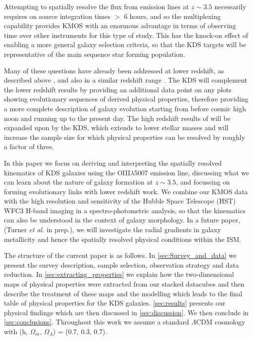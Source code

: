 \documentclass[a4paper,fleqn,usenatbib]{mn2e}
\begin{document}
Attempting to spatially resolve the flux from emission lines at $z \sim 3.5$ necessarily requires on source integration times $>$ 6 hours, and so the multiplexing capability provides KMOS with an enormous advantage in terms of observing time over other instruments for this type of study.
This has the knock-on effect of enabling a more general galaxy selection criteria, so that the KDS targets will be representative of the main sequence star forming population. 

Many of these questions have already been addressed at lower redshift, as described above \citep{ForsterSchreiber2009,Wisnioski2015,Stott2016}, and also in a similar redshift range \cite{Gnerucci2011}.
The KDS will complement the lower redshift results by providing an additional data point on any plots showing evolutionary sequences of derived physical properties, therefore providing a more complete description of galaxy evolution starting from before cosmic high noon and running up to the present day.
The high redshift results of \cite{Gnerucci2011} will be expanded upon by the KDS, which extends to lower stellar masses and will increase the sample size for which physical properties can be resolved by roughly a factor of three.

In this paper we focus on deriving and interpreting the spatially resolved kinematics of KDS galaxies using the OIII$\lambda$5007 emission line, discussing what we can learn about the nature of galaxy formation at $z \sim 3.5$, and focussing on forming evolutionary links with lower redshift work.
We combine our KMOS data with the high resolution and sensitivity of the Hubble Space Telescope (HST) WFC3 H-band imaging in a spectro-photometric analysis, so that the kinematics can also be understood in the context of galaxy morphology.
In a future paper, (Turner \textit{et al.} in prep.), we will investigate the radial gradients in galaxy metallicity and hence the spatially resolved physical conditions within the ISM.

The structure of the current paper is as follows. In \cref{sec:Survey_and_data} we present the survey description, sample selection, observation strategy and data reduction.
In \cref{sec:extracting_properties} we explain how the two-dimensional maps of physical properties were extracted from our stacked datacubes and then describe the treatment of these maps and the modelling which leads to the final table of physical properties for the KDS galaxies. 
\cref{sec:results} presents our physical findings which are then discussed in \cref{sec:discussion}.
We then conclude in \cref{sec:conclusions}.
Throughout this work we assume a standard $\Lambda$CDM cosmology with (h, $\Omega_{m}$, $\Omega_{\Lambda}$) = (0.7, 0.3, 0.7). 
\end{document}
